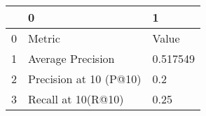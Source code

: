 \begin{tabular}{lll}
\toprule
{} &                       0 &         1 \\
\midrule
0 &                  Metric &     Value \\
1 &       Average Precision &  0.517549 \\
2 &  Precision at 10 (P@10) &       0.2 \\
3 &      Recall at 10(R@10) &      0.25 \\
\bottomrule
\end{tabular}
